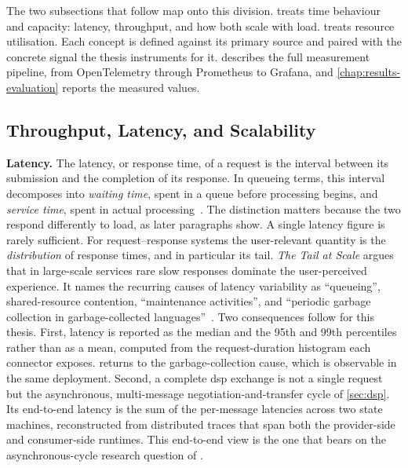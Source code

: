 The two subsections that follow map onto this division.  treats time behaviour and capacity: latency, throughput, and how both scale with load.  treats resource utilisation. Each concept is defined against its primary source and paired with the concrete signal the thesis instruments for it.  describes the full measurement pipeline, from OpenTelemetry through Prometheus to Grafana, and \cref{chap:results-evaluation} reports the measured values.

\pagebreak

\subsection{Throughput, Latency, and Scalability}\label{subsec:performance-metrics}

\textbf{Latency.} The latency, or response time, of a request is the interval between its submission and the completion of its response. In queueing terms, this interval decomposes into \emph{waiting time}, spent in a queue before processing begins, and \emph{service time}, spent in actual processing~\citep{jain1991art}. The distinction matters because the two respond differently to load, as later paragraphs show. A single latency figure is rarely sufficient. For request--response systems the user-relevant quantity is the \emph{distribution} of response times, and in particular its tail. \emph{The Tail at Scale} argues that in large-scale services rare slow responses dominate the user-perceived experience. It names the recurring causes of latency variability as ``queueing'', shared-resource contention, ``maintenance activities'', and ``periodic garbage collection in garbage-collected languages''~\citep{dean2013tail}. Two consequences follow for this thesis. First, latency is reported as the median and the 95th and 99th percentiles rather than as a mean, computed from the request-duration histogram each connector exposes.  returns to the garbage-collection cause, which is observable in the same deployment. Second, a complete \gls{dsp} exchange is not a single request but the asynchronous, multi-message negotiation-and-transfer cycle of \cref{sec:dsp}. Its end-to-end latency is the sum of the per-message latencies across two state machines, reconstructed from distributed traces that span both the provider-side and consumer-side runtimes. This end-to-end view is the one that bears on the asynchronous-cycle research question of .

